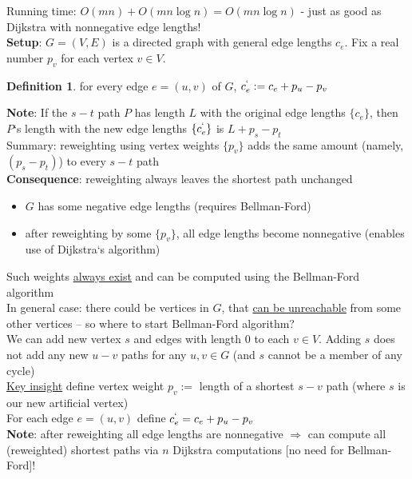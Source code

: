 \documentclass[a4paper,12pt]{article}
\theoremstyle{plain}
\theoremstyle{definition}
\newtheorem*{definition}{Definition}
\theoremstyle{remark}
\begin{document}
Running time: $O(mn) + O(mn \log n) = O(mn \log n)$ - just as good as Dijkstra with nonnegative edge lengths!
\\

\textbf{Setup}: $G = (V, E)$ is a directed graph with general edge lengths $c_e$. Fix a real number $p_v$ for each vertex $v \in V$.

\begin{definition}for every edge $e = (u, v)$ of $G$, $c_e^` := c_e + p_u - p_v$\end{definition}

\textbf{Note}: If the $s-t$ path $P$ has length $L$ with the original edge lengths $\{c_e\}$, then $P$`s length with the new edge lengths $\{c_e^`\}$ is \underline{$L + p_s - p_t$}
\\

Summary: reweighting using vertex weights $\{p_v\}$ adds the same amount (namely, $(p_s - p_t)$) to every $s-t$ path
\\

\textbf{Consequence}: reweighting always leaves the shortest path unchanged
\begin{itemize}
	\item $G$ has some negative edge lengths (requires Bellman-Ford)
	\item after reweighting by some $\{p_v\}$, all edge lengths become nonnegative (enables use of Dijkstra`s algorithm)
\end{itemize}

Such weights \underline{always exist} and can be computed using the Bellman-Ford algorithm
\\

In general case: there could be vertices in $G$, that \underline{can be unreachable} from some other vertices -- so where to start Bellman-Ford algorithm?
\\

We can add new vertex $s$ and edges with length $0$ to each $v \in V$. Adding $s$ does not add any new $u-v$ paths for any $u, v \in G$ (and $s$ cannot be a member of any cycle)
\\

\underline{Key insight} define vertex weight $p_v :=$ length of a shortest $s-v$ path (where $s$ is our new artificial vertex)
\\

For each edge $e = (u, v)$ define $c_e^` = c_e + p_u - p_v$
\\

\textbf{Note}: after reweighting all edge lengths are nonnegative $\Rightarrow$ can compute all (reweighted) shortest paths via $n$ Dijkstra computations [no need for Bellman-Ford]!
\\
\end{document}
